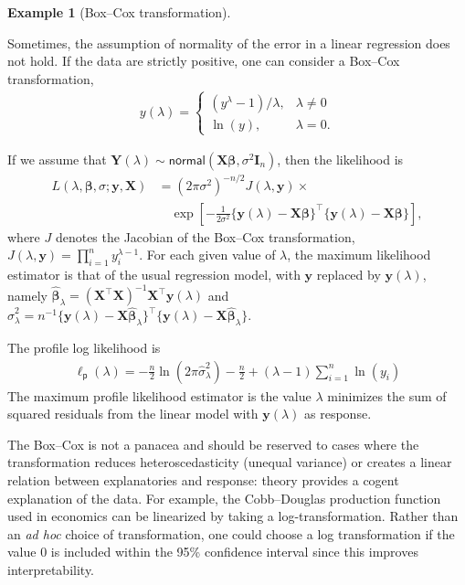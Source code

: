 \documentclass[
  11pt,
  letterpaper,
]{scrbook}
\theoremstyle{plain}
\theoremstyle{definition}
\newtheorem{example}{Example}[chapter]
\theoremstyle{definition}
\theoremstyle{remark}
\begin{document}
\begin{example}[Box--Cox
transformation]\protect\hypertarget{exm-boxcox}{}\label{exm-boxcox}

Sometimes, the assumption of normality of the error in a linear
regression does not hold. If the data are strictly positive, one can
consider a Box--Cox transformation, \begin{align*}
y(\lambda)= \begin{cases}
(y^{\lambda}-1)/\lambda, & \lambda \neq 0\\
\ln(y), & \lambda=0.
\end{cases}
\end{align*}

If we assume that
\(\boldsymbol{Y}(\lambda) \sim \mathsf{normal}(\mathbf{X}\boldsymbol{\beta}, \sigma^2 \mathbf{I}_n)\),
then the likelihood is \begin{align*}
L(\lambda, \boldsymbol{\beta}, \sigma; \boldsymbol{y}, \mathbf{X}) &= (2\pi\sigma^2)^{-n/2} J(\lambda, \boldsymbol{y}) \times\\& \quad \exp \left[ - \frac{1}{2\sigma^2}\{\boldsymbol{y}(\lambda) - \mathbf{X}\boldsymbol{\beta}\}^\top\{\boldsymbol{y}(\lambda) - \mathbf{X}\boldsymbol{\beta}\}\right],
\end{align*} where \(J\) denotes the Jacobian of the Box--Cox
transformation,
\(J(\lambda, \boldsymbol{y})=\prod_{i=1}^n y_i^{\lambda-1}\). For each
given value of \(\lambda\), the maximum likelihood estimator is that of
the usual regression model, with \(\boldsymbol{y}\) replaced by
\(\boldsymbol{y}(\lambda)\), namely
\(\widehat{\boldsymbol{\beta}}_\lambda = (\mathbf{X}^\top\mathbf{X})^{-1}\mathbf{X}^\top \boldsymbol{y}(\lambda)\)
and
\(\widehat{\sigma}^2_\lambda = n^{-1}\{ \boldsymbol{y}(\lambda) - \mathbf{X}\widehat{\boldsymbol{\beta}}_\lambda\}^\top\{ \boldsymbol{y}(\lambda) - \mathbf{X}\widehat{\boldsymbol{\beta}}_\lambda\}\).

The profile log likelihood is \begin{align*}
\ell_{\mathsf{p}}(\lambda) = -\frac{n}{2}\ln(2\pi \widehat{\sigma}^2_\lambda) - \frac{n}{2} + (\lambda - 1)\sum_{i=1}^n \ln(y_i)
\end{align*} The maximum profile likelihood estimator is the value
\(\lambda\) minimizes the sum of squared residuals from the linear model
with \(\boldsymbol{y}(\lambda)\) as response.

The Box--Cox is not a panacea and should be reserved to cases where the
transformation reduces heteroscedasticity (unequal variance) or creates
a linear relation between explanatories and response: theory provides a
cogent explanation of the data. For example, the Cobb--Douglas
production function used in economics can be linearized by taking a
log-transformation. Rather than an \emph{ad hoc} choice of
transformation, one could choose a log transformation if the value \(0\)
is included within the 95\% confidence interval since this improves
interpretability.

\end{example}
\end{document}
